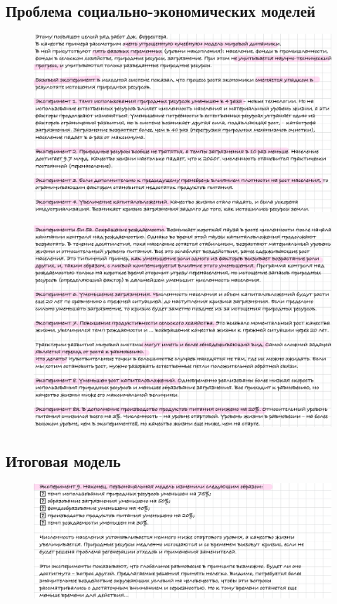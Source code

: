 	\subsection{Проблема социально-экономических моделей}
	\vspace{-1em}
	\begin{figure}[H]
		\centering
		\includegraphics[width=1\linewidth, height=0.35\textheight]{img/30_05}
		\label{fig:30_05}
	\end{figure}
	\vspace{-2em}
	\begin{figure}[H]
		\centering
		\includegraphics[width=1\linewidth, height=0.35\textheight]{img/30_06}
		\label{fig:30_06}
	\end{figure}
	\newpage
	\subsection{Итоговая модель}
	\vspace{-1em}
	\begin{figure}[H]
		\centering
		\includegraphics[width=1\linewidth, height=0.2\textheight]{img/30_07}
		\label{fig:30_07}
	\end{figure}
	
